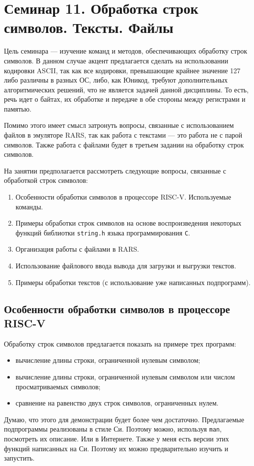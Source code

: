 \chapter[Обработка строк символов]{Семинар 11. Обработка строк символов. Тексты. Файлы}

Цель семинара --- изучение команд и методов, обеспечивающих обработку строк символов. В данном случае акцент предлагается сделать на использовании кодировки ASCII, так как все кодировки, превышающие крайнее значение 127 либо различны в разных ОС, либо, как Юникод, требуют дополнительных алгоритмических решений, что не является задачей данной дисциплины. То есть, речь идет о байтах, их обработке и передаче в обе стороны между регистрами и памятью.

Помимо этого имеет смысл затронуть вопросы, связанные с использованием файлов в эмуляторе RARS, так как работа с текстами --- это работа не с парой символов. Также работа с файлами будет в третьем задании на обработку строк символов.

На занятии предполагается рассмотреть следующие вопросы, связанные с обработкой строк символов:
\begin{enumerate}
    \item Особенности обработки символов в процессоре RISC-V. Используемые команды.
    \item Примеры обработки строк символов на основе воспроизведения некоторых функций библиотки \verb|string.h| языка программирования \verb|C|.
    \item Организация работы с файлами в RARS.
    \item Использование файлового ввода вывода для загрузки и выгрузки текстов.
    \item Примеры обработки текстов (с использование уже написанных подпрограмм).
\end{enumerate}

\section{Особенности обработки символов в процессоре RISC-V}

Обработку строк символов предлагается показать на примере трех программ:
\begin{itemize}
    \item вычисление длины строки, ограниченной нулевым символом;
    \item вычисление длины строки, ограниченной нулевым символом или числом просматриваемых символов;
    \item сравнение на равенство двух строк символов, ограниченных нулем.
\end{itemize}
Думаю, что этого для демонстрации будет более чем достаточно. Предлагаемые подпрограммы реализованы в стиле Си. Поэтому можно, используя \verb|man|, посмотреть их описание. Или в Интернете. Также у меня есть версии этих функций написанных на Си. Поэтому их можно предварительно изучить и запустить.

